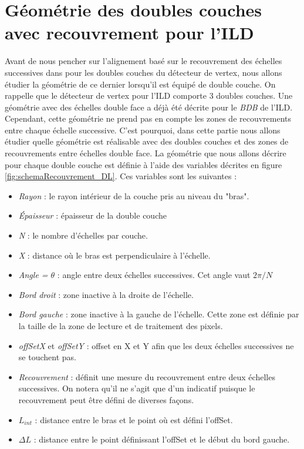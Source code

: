   \section{G\'eom\'etrie des doubles couches avec recouvrement pour l'ILD}
  \label{sect:geom}
  
  Avant de nous pencher sur l'alignement bas\'e sur le recouvrement des \'echelles successives dans pour les doubles couches du d\'etecteur de vertex, nous allons \'etudier la g\'eom\'etrie de ce dernier lorsqu'il est \'equipé de double couche. On rappelle que le d\'etecteur de vertex pour l'ILD comporte 3 doubles couches. Une g\'eom\'etrie avec des \'echelles double face a d\'ejà \'et\'e d\'ecrite pour le \textit{BDB} de l'ILD. Cependant, cette g\'eom\'etrie  ne prend pas en compte les zones de recouvrements entre chaque \'echelle successive. C'est pourquoi, dans cette partie nous allons \'etudier quelle g\'eom\'etrie est r\'ealisable avec des doubles couches et des zones de recouvrements entre \'echelles double face. La g\'eom\'etrie que nous allons d\'ecrire pour chaque double couche est d\'efinie \`a l'aide des variables d\'ecrites en figure \ref{fig:schemaRecouvrement_DL}. Ces variables sont les suivantes :
  
  \medskip
  
  \renewcommand{\labelitemi}{$\bullet$}
  
  \begin{itemize}
   \item \textit{Rayon} : le rayon int\'erieur de la couche pris au niveau du "bras".
   \item \textit{Épaisseur} : \'epaisseur de la double couche
   \item \textit{N} : le nombre d'\'echelles par couche.
   \item \textit{X} : distance o\`u le bras est perpendiculaire \`a l'\'echelle.
   \item \textit{Angle = $\theta$} : angle entre deux \'echelles successives. Cet angle vaut $2\pi/N$
   \item \textit{Bord droit} : zone inactive \`a la droite de l'\'echelle.
   \item \textit{Bord gauche} : zone inactive \`a la gauche de l'\'echelle. Cette zone est d\'efinie par la taille de la zone de lecture et de traitement des pixels.
   \item \textit{offSetX} et \textit{offSetY} : offset en X et Y afin que les deux \'echelles successives ne se touchent pas.
   \item \textit{Recouvrement} : d\'efinit une mesure du recouvrement entre deux \'echelles successives. On notera qu'il ne s'agit que d'un indicatif puisque le recouvrement peut \^etre d\'efini de diverses façons.
   \item \textit{$L_{int}$} : distance entre le bras et le point o\`u est d\'efini l'offSet.
   \item \textit{$\Delta L$} : distance entre le point d\'efinissant l'offSet et le d\'ebut du bord gauche.
   \end{itemize}
   
